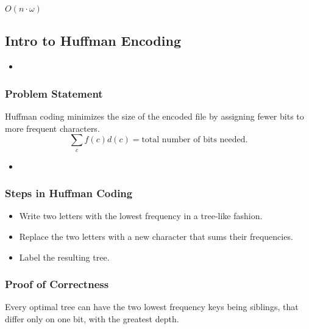\begin{definition}
    $O(n\cdot \omega)$
\end{definition}

\subsection{Intro to Huffman Encoding}
\begin{intuition}
    \begin{itemize}
        \item 
    \end{itemize}
\end{intuition}

\subsubsection{Problem Statement}
\begin{intuition}
Huffman coding minimizes the size of the encoded file by assigning fewer bits to more frequent characters.
\begin{equation*}
    \sum_c f(c)d(c) = \text{total number of bits needed.}
\end{equation*}
\end{intuition}

\begin{example}
    \begin{itemize}
        \item 
    \end{itemize}
\end{example}

\subsubsection{Steps in Huffman Coding}
\begin{itemize}
    \item Write two letters with the lowest frequency in a tree-like fashion.
    \item Replace the two letters with a new character that sums their frequencies.
    \item Label the resulting tree.
\end{itemize}

\subsubsection{Proof of Correctness}
\begin{theorem}
Every optimal tree can have the two lowest frequency keys being siblings, that differ only on one bit, with the greatest depth.

\end{theorem}

